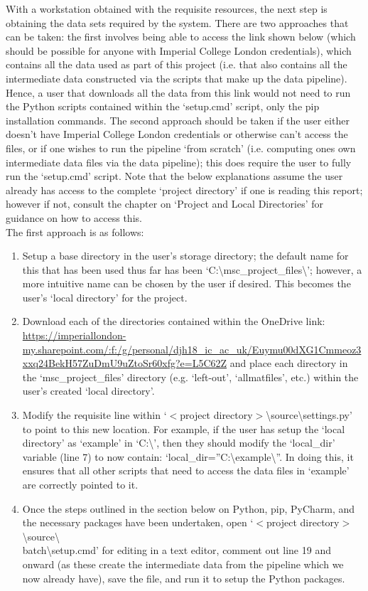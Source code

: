 \documentclass[12pt,twoside]{report}
\begin{document}
\quad With a workstation obtained with the requisite resources, the next step is obtaining the data sets required by the system. There are two approaches that can be taken: the first involves being able to access the link shown below (which should be possible for anyone with Imperial College London credentials), which contains all the data used as part of this project (i.e. that also contains all the intermediate data constructed via the scripts that make up the data pipeline). Hence, a user that downloads all the data from this link would not need to run the Python scripts contained within the ‘setup.cmd’ script, only the pip installation commands. The second approach should be taken if the user either doesn’t have Imperial College London credentials or otherwise can’t access the files, or if one wishes to run the pipeline ‘from scratch’ (i.e. computing ones own intermediate data files via the data pipeline); this does require the user to fully run the ‘setup.cmd’ script. Note that the below explanations assume the user already has access to the complete ‘project directory’ if one is reading this report; however if not, consult the chapter on ‘Project and Local Directories’ for guidance on how to access this.\\

The first approach is as follows:

\begin{enumerate}
	\item Setup a base directory in the user’s storage directory; the default name for this that has been used thus far has been ‘C:\textbackslash msc\_project\_files\textbackslash ’; however, a more intuitive name can be chosen by the user if desired. This becomes the user’s ‘local directory’ for the project.
	\item Download each of the directories contained within the OneDrive link: \url{https://imperiallondon-my.sharepoint.com/:f:/g/personal/djh18\_ic\_ac\_uk/Euymu00dXG1Cmmeoz3xxq24BekH57ZuDmU9uZtoSr60xfg?e=L5C62Z} and place each directory in the ‘msc\_project\_files’ directory (e.g. ‘left-out’, ‘allmatfiles’, etc.) within the user’s created ‘local directory’.
	\item Modify the requisite line within ‘$<$project directory$>$\textbackslash source\textbackslash settings.py’ to point to this new location. For example, if the user has setup the ‘local directory’ as ‘example’ in ‘C:\textbackslash’, then they should modify the ‘local\_dir’ variable (line 7) to now contain: ‘local\_dir=”C:\textbackslash example\textbackslash”. In doing this, it ensures that all other scripts that need to access the data files in ‘example’ are correctly pointed to it.
	\item Once the steps outlined in the section below on Python, pip, PyCharm, and the necessary packages have been undertaken, open ‘$<$project directory$>$\textbackslash source\textbackslash\\ batch\textbackslash setup.cmd’ for editing in a text editor, comment out line 19 and onward (as these create the intermediate data from the pipeline which we now already have), save the file, and run it to setup the Python packages.
\end{enumerate}
\end{document}
